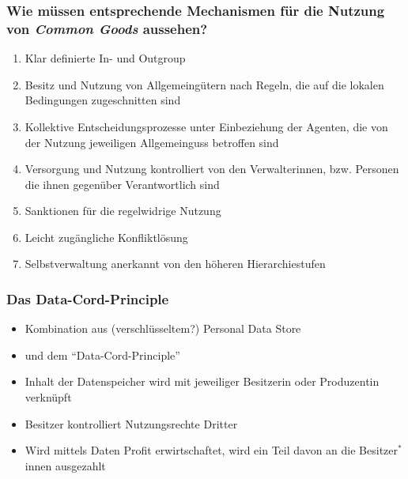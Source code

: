 \begin{frame}
	\frametitle{Wie müssen entsprechende Mechanismen für die Nutzung von \textit{Common Goods} aussehen?}
	\begin{enumerate}
		\item
			Klar definierte  In- und Outgroup
		\item
			Besitz und Nutzung von Allgemeingütern nach Regeln, die auf die lokalen Bedingungen zugeschnitten sind
		\item
			Kollektive Entscheidungsprozesse unter Einbeziehung der Agenten, die von der Nutzung jeweiligen Allgemeinguss betroffen sind 
		\item
			Versorgung und Nutzung kontrolliert von den Verwalter\gend{}innen, bzw. Personen die ihnen gegenüber Verantwortlich sind
		\item
			Sanktionen für die regelwidrige Nutzung
		\item
			Leicht zugängliche Konfliktlösung 
		\item
			Selbstverwaltung anerkannt von den höheren Hierarchiestufen
	\end{enumerate}
\end{frame}

\begin{frame}
	\frametitle{Das Data-Cord-Principle}
	\begin{itemize}
		\item
			Kombination aus (verschlüsseltem?) Personal Data Store
		\item
			und dem \enquote{Data-Cord-Principle}
		\item
			Inhalt der Datenspeicher wird mit jeweilige\gend{}r Besitzer\gend{}in oder Produzent\gend{}in verknüpft
		\item
			Besitzer kontrolliert Nutzungsrechte Dritter 
		\item
			Wird mittels Daten Profit erwirtschaftet, wird ein Teil davon an die Besitzer$^*$innen ausgezahlt
	\end{itemize}
\end{frame}

